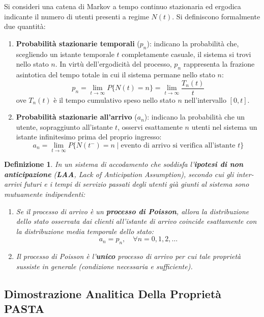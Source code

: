 \documentclass[11pt, a4paper]{article}
\newtheorem{theorem}{Definizione}
\begin{document}
Si consideri una catena di Markov a tempo continuo stazionaria ed ergodica indicante il numero di utenti presenti a regime $N(t)$. Si definiscono formalmente due quantità:
\begin{enumerate}
    \item \textbf{Probabilità stazionarie temporali} ($p_n$): indicano la probabilità che, scegliendo un istante temporale $t$ completamente casuale, il sistema si trovi nello stato $n$. In virtù dell'ergodicità del processo, $p_n$ rappresenta la frazione asintotica del tempo totale in cui il sistema permane nello stato $n$:
    \[
    p_n = \lim_{t \to \infty} P\{N(t) = n\} = \lim_{t \to \infty} \frac{T_n(t)}{t}
    \]
    ove $T_n(t)$ è il tempo cumulativo speso nello stato $n$ nell'intervallo $[0, t]$.
    \item \textbf{Probabilità stazionarie all'arrivo} ($a_n$): indicano la probabilità che un utente, sopraggiunto all'istante $t$, osservi esattamente $n$ utenti nel sistema un istante infinitesimo prima del proprio ingresso:
    \[
    a_n = \lim_{t \to \infty} P\{N(t^-) = n \mid \text{evento di arrivo si verifica all'istante } t\}
    \]
\end{enumerate}


\begin{theorem}
In un sistema di accodamento che soddisfa l'\textbf{ipotesi di non anticipazione} (\textbf{LAA}, \emph{Lack of Anticipation Assumption}), secondo cui gli inter-arrivi futuri e i tempi di servizio passati degli utenti già giunti al sistema sono mutuamente indipendenti:
\begin{enumerate}
    \item Se il processo di arrivo è un \textbf{processo di Poisson}, allora la distribuzione dello stato osservata dai clienti all'istante di arrivo coincide esattamente con la distribuzione media temporale dello stato:
    \[
    \boxed{a_n = p_n, \quad \forall n = 0, 1, 2, \dots}
    \]
    \item Il processo di Poisson è l'\textbf{unico} processo di arrivo per cui tale proprietà sussiste in generale (condizione necessaria e sufficiente).
\end{enumerate}
\end{theorem}

\subsection{Dimostrazione Analitica Della Proprietà PASTA}
\end{document}
